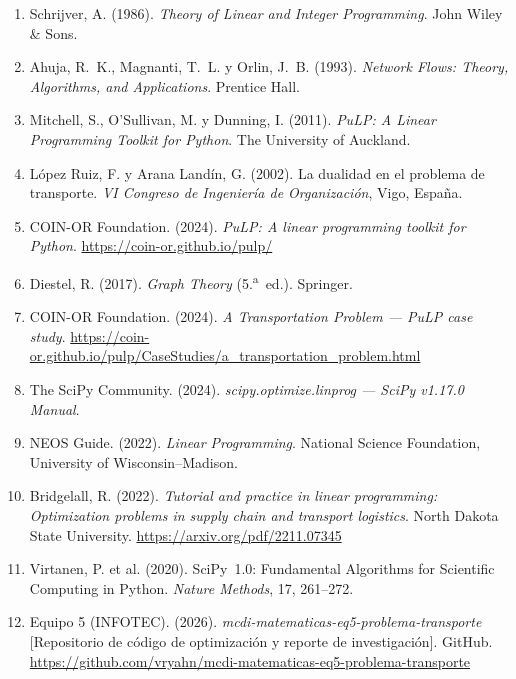 \documentclass[10pt,letterpaper,twocolumn]{article}
\begin{document}
\begin{enumerate}[leftmargin=1.2em,itemsep=0.4ex]
\item Schrijver, A. (1986). \emph{Theory of Linear and Integer Programming}. John Wiley \& Sons.
\item Ahuja, R.~K., Magnanti, T.~L. y Orlin, J.~B. (1993). \emph{Network Flows: Theory, Algorithms, and Applications}. Prentice Hall.
\item Mitchell, S., O'Sullivan, M. y Dunning, I. (2011). \emph{PuLP: A Linear Programming Toolkit for Python}. The University of Auckland.
\item López Ruiz, F. y Arana Landín, G. (2002). La dualidad en el problema de transporte. \emph{VI Congreso de Ingeniería de Organización}, Vigo, España.
\item COIN-OR Foundation. (2024). \emph{PuLP: A linear programming toolkit for Python}. \url{https://coin-or.github.io/pulp/}
\item Diestel, R. (2017). \emph{Graph Theory} (5.\textsuperscript{a}~ed.). Springer.
\item COIN-OR Foundation. (2024). \emph{A Transportation Problem --- PuLP case study}. \url{https://coin-or.github.io/pulp/CaseStudies/a_transportation_problem.html}
\item The SciPy Community. (2024). \emph{scipy.optimize.linprog --- SciPy v1.17.0 Manual}.
\item NEOS Guide. (2022). \emph{Linear Programming}. National Science Foundation, University of Wisconsin--Madison.
\item Bridgelall, R. (2022). \emph{Tutorial and practice in linear programming: Optimization problems in supply chain and transport logistics}. North Dakota State University. \url{https://arxiv.org/pdf/2211.07345}
\item Virtanen, P. et al. (2020). SciPy~1.0: Fundamental Algorithms for Scientific Computing in Python. \emph{Nature Methods}, 17, 261--272.
\item Equipo 5 (INFOTEC). (2026). \emph{mcdi-matematicas-eq5-problema-transporte} [Repositorio de código de optimización y reporte de investigación]. GitHub. \url{https://github.com/vryahn/mcdi-matematicas-eq5-problema-transporte}
\end{enumerate}

\onecolumn
\newpage
\thispagestyle{empty}
\end{document}
